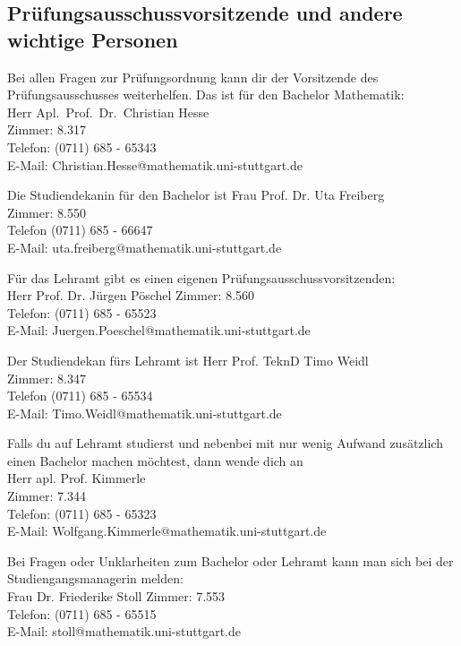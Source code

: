 \newpage
\subsection{Prüfungsausschussvorsitzende und andere wichtige Personen}

Bei allen Fragen zur Prüfungsordnung
kann dir der Vorsitzende des Prüfungsausschusses weiterhelfen.
Das ist für den Bachelor Mathematik:\\
Herr Apl.~Prof.~Dr.~Christian Hesse\\
Zimmer: 8.317\\
Telefon: (0711) 685 - 65343\\
E-Mail: Christian.Hesse@mathematik.uni-stuttgart.de

Die Studiendekanin für den  Bachelor ist
Frau Prof. Dr. Uta Freiberg\\
Zimmer: 8.550\\
Telefon (0711) 685 - 66647\\
E-Mail:  uta.freiberg@mathematik.uni-stuttgart.de

\label{LAzust}
Für das Lehramt gibt es einen eigenen Prüfungsausschussvorsitzenden:\\
Herr Prof. Dr. Jürgen Pöschel
Zimmer:  8.560\\
Telefon: (0711) 685 - 65523\\
E-Mail: Juergen.Poeschel@mathematik.uni-stuttgart.de

Der Studiendekan fürs Lehramt ist
Herr Prof. TeknD Timo Weidl\\
Zimmer: 8.347\\
Telefon (0711) 685 - 65534\\
E-Mail: Timo.Weidl@mathematik.uni-stuttgart.de

Falls du auf Lehramt studierst
und nebenbei mit nur wenig Aufwand
zusätzlich einen Bachelor machen möchtest,
dann wende dich an\\
Herr apl. Prof. Kimmerle\\
Zimmer: 7.344\\
Telefon: (0711) 685 - 65323\\
E-Mail: Wolfgang.Kimmerle@mathematik.uni-stuttgart.de

Bei Fragen oder Unklarheiten zum Bachelor
oder Lehramt kann man sich
bei der Studiengangsmanagerin melden:\\
Frau Dr. Friederike Stoll
Zimmer:  7.553 \\
Telefon: (0711) 685 - 65515 \\
E-Mail: stoll@mathematik.uni-stuttgart.de

